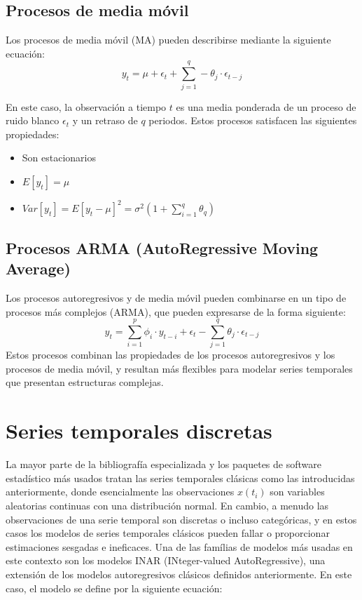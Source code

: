 \documentclass[12pt,twoside]{article} %
\begin{document}
\subsection{Procesos de media móvil}
Los procesos de media móvil (MA) pueden describirse mediante la siguiente ecuación:
\begin{equation}
y_t= \mu + \epsilon_t+\sum_{j=1}^q -\theta_j \cdot \epsilon_{t-j}
\end{equation}

En este caso, la observación a tiempo $t$ es una media ponderada de un proceso de ruido blanco $\epsilon_t$ y un retraso de $q$ periodos. Estos procesos satisfacen las siguientes propiedades:
\begin{itemize}
 \item Son estacionarios
 \item $E[y_t]=\mu$
 \item $Var[y_t]=E[y_t-\mu]^2=\sigma^2 (1+\sum_{i=1}^q \theta_q)$
\end{itemize}

\subsection{Procesos ARMA (AutoRegressive Moving Average)}
Los procesos autoregresivos y de media móvil pueden combinarse en un tipo de procesos más complejos (ARMA), que pueden expresarse de la forma siguiente:
\begin{equation}
y_t = \sum_{i=1}^p \phi_i \cdot y_{t-i} + \epsilon_t - \sum_{j=1}^q \theta_j \cdot \epsilon_{t-j}
\end{equation}
Estos procesos combinan las propiedades de los procesos autoregresivos y los procesos de media móvil, y resultan más flexibles para modelar series temporales que presentan estructuras complejas.

\section{Series temporales discretas}
La mayor parte de la bibliografía especializada y los paquetes de software estadístico más usados tratan las series temporales clásicas como las introducidas anteriormente, donde esencialmente las observaciones $x(t_i)$ son variables aleatorias continuas con una distribución normal. En cambio, a menudo las observaciones de una serie temporal son discretas o incluso categóricas, y en estos casos los modelos de series temporales clásicos pueden fallar o proporcionar estimaciones sesgadas e ineficaces. Una de las famílias de modelos más usadas en este contexto son los modelos INAR (INteger-valued AutoRegressive), una extensión de los modelos autoregresivos clásicos definidos anteriormente. En este caso, el modelo se define por la siguiente ecuación:
\end{document}
